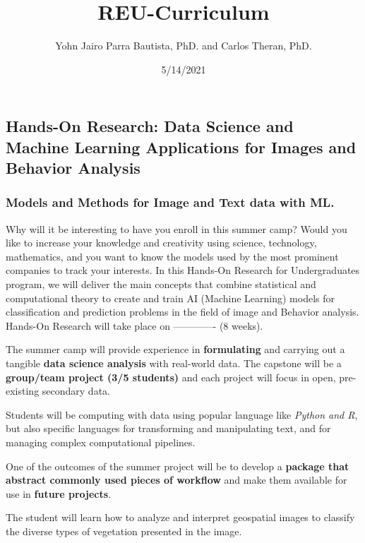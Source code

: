 \documentclass[
]{article}
\title{REU-Curriculum}
\author{Yohn Jairo Parra Bautista, PhD. and Carlos Theran, PhD.}
\date{5/14/2021}
\begin{document}
\maketitle

\hypertarget{hands-on-research-data-science-and-machine-learning-applications-for-images-and-behavior-analysis}{%
\subsection{Hands-On Research: Data Science and Machine Learning
Applications for Images and Behavior
Analysis}\label{hands-on-research-data-science-and-machine-learning-applications-for-images-and-behavior-analysis}}

\hypertarget{models-and-methods-for-image-and-text-data-with-ml.}{%
\subsubsection{Models and Methods for Image and Text data with
ML.}\label{models-and-methods-for-image-and-text-data-with-ml.}}

Why will it be interesting to have you enroll in this summer camp? Would
you like to increase your knowledge and creativity using science,
technology, mathematics, and you want to know the models used by the
most prominent companies to track your interests. In this Hands-On
Research for Undergraduates program, we will deliver the main concepts
that combine statistical and computational theory to create and train AI
(Machine Learning) models for classification and prediction problems in
the field of image and Behavior analysis. Hands-On Research will take
place on ------------- (8 weeks).

The summer camp will provide experience in \textbf{formulating} and
carrying out a tangible \textbf{data science analysis} with real-world
data. The capstone will be a \textbf{group/team project (3/5 students)}
and each project will focus in open, pre-existing secondary data.

Students will be computing with data using popular language like
\emph{Python and R}, but also specific languages for transforming and
manipulating text, and for managing complex computational pipelines.

One of the outcomes of the summer project will be to develop a
\textbf{package that abstract commonly used pieces of workflow} and make
them available for use in \textbf{future projects}.

The student will learn how to analyze and interpret geospatial images to
classify the diverse types of vegetation presented in the image.
\end{document}
